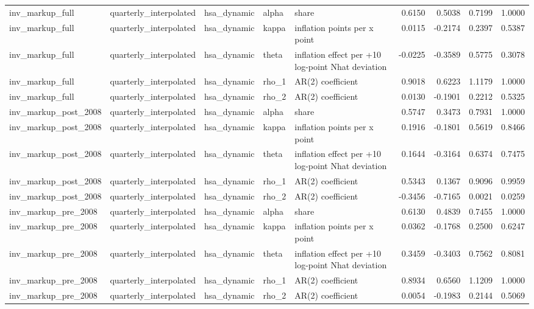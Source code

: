\begin{tabular}{lllllrrrr}
inv\_markup\_full & quarterly\_interpolated & hsa\_dynamic & alpha & share & 0.6150 & 0.5038 & 0.7199 & 1.0000 \\
inv\_markup\_full & quarterly\_interpolated & hsa\_dynamic & kappa & inflation points per x point & 0.0115 & -0.2174 & 0.2397 & 0.5387 \\
inv\_markup\_full & quarterly\_interpolated & hsa\_dynamic & theta & inflation effect per +10 log-point Nhat deviation & -0.0225 & -0.3589 & 0.5775 & 0.3078 \\
inv\_markup\_full & quarterly\_interpolated & hsa\_dynamic & rho\_1 & AR(2) coefficient & 0.9018 & 0.6223 & 1.1179 & 1.0000 \\
inv\_markup\_full & quarterly\_interpolated & hsa\_dynamic & rho\_2 & AR(2) coefficient & 0.0130 & -0.1901 & 0.2212 & 0.5325 \\
inv\_markup\_post\_2008 & quarterly\_interpolated & hsa\_dynamic & alpha & share & 0.5747 & 0.3473 & 0.7931 & 1.0000 \\
inv\_markup\_post\_2008 & quarterly\_interpolated & hsa\_dynamic & kappa & inflation points per x point & 0.1916 & -0.1801 & 0.5619 & 0.8466 \\
inv\_markup\_post\_2008 & quarterly\_interpolated & hsa\_dynamic & theta & inflation effect per +10 log-point Nhat deviation & 0.1644 & -0.3164 & 0.6374 & 0.7475 \\
inv\_markup\_post\_2008 & quarterly\_interpolated & hsa\_dynamic & rho\_1 & AR(2) coefficient & 0.5343 & 0.1367 & 0.9096 & 0.9959 \\
inv\_markup\_post\_2008 & quarterly\_interpolated & hsa\_dynamic & rho\_2 & AR(2) coefficient & -0.3456 & -0.7165 & 0.0021 & 0.0259 \\
inv\_markup\_pre\_2008 & quarterly\_interpolated & hsa\_dynamic & alpha & share & 0.6130 & 0.4839 & 0.7455 & 1.0000 \\
inv\_markup\_pre\_2008 & quarterly\_interpolated & hsa\_dynamic & kappa & inflation points per x point & 0.0362 & -0.1768 & 0.2500 & 0.6247 \\
inv\_markup\_pre\_2008 & quarterly\_interpolated & hsa\_dynamic & theta & inflation effect per +10 log-point Nhat deviation & 0.3459 & -0.3403 & 0.7562 & 0.8081 \\
inv\_markup\_pre\_2008 & quarterly\_interpolated & hsa\_dynamic & rho\_1 & AR(2) coefficient & 0.8934 & 0.6560 & 1.1209 & 1.0000 \\
inv\_markup\_pre\_2008 & quarterly\_interpolated & hsa\_dynamic & rho\_2 & AR(2) coefficient & 0.0054 & -0.1983 & 0.2144 & 0.5069 \\

\end{tabular}
